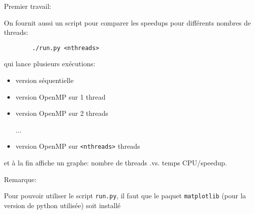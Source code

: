 \documentclass{beamer}
\begin{document}
\begin{frame}
	Premier travail:
	\bigskip
	
	
\end{frame}

\begin{frame}[fragile]
	On fournit aussi un script pour comparer les speedups pour différents nombres de threads:
	
	{\color{blue}\begin{verbatim}
		./run.py <nthreads>
		\end{verbatim}
	}
	qui lance plusieurs exécutions:
	\begin{itemize}
		\item version séquentielle
		\item version OpenMP sur 1 thread
		\item version OpenMP sur 2 threads
		
		...
		\item version OpenMP sur \verb|<nthreads>| threads
	\end{itemize}
	
	et à la fin affiche un graphe: nombre de threads .vs. temps CPU/speedup.
	
	\vfill
	Remarque:
	\medskip
	
	\hspace{1cm}\begin{minipage}{0.9\textwidth}
		Pour pouvoir utiliser le script {\tt run.py},
		il faut que le paquet {\tt matplotlib} (pour la version de python utilisée) soit installé
	\end{minipage}
	
\end{frame}
\end{document}
